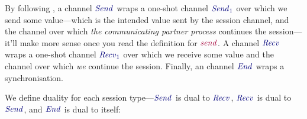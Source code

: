 \documentclass[sigplan,screen]{acmart}
\newcommand{\Conid}[1]{\mathit{#1}}
\newcommand{\Varid}[1]{\mathit{#1}}
\begin{document}
By following \citet {DardhaGS17}, a channel \ensuremath{\seshtysend} wraps a one-shot channel \ensuremath{\ty{\Conid{Send}_1}} over which we send some value---which is the intended value sent by the session channel, and the channel over which \emph{the communicating partner process} continues the session---it'll make more sense once you read the definition for \ensuremath{\tm{\Varid{send}}}.
A channel \ensuremath{\seshtyrecv} wraps a one-shot channel \ensuremath{\ty{\Conid{Recv}_1}} over which we receive some value and the channel over which \emph{we} continue the session.
Finally, an channel \ensuremath{\seshtyend} wraps a synchronisation.

We define duality for each session type---\ensuremath{\seshtysend} is dual to \ensuremath{\seshtyrecv}, \ensuremath{\seshtyrecv} is dual to \ensuremath{\seshtysend}, and \ensuremath{\seshtyend} is dual to itself:
\end{document}
